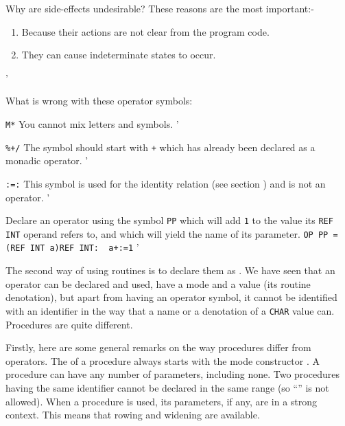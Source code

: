 \begin{exercise}
\item Why are side-effects undesirable? \ans These reasons are the
most important:-
\begin{enumerate}
\item Because their actions are not clear from the program code.
\item They can cause indeterminate states to occur.
\end{enumerate}
'
\item What is wrong with these operator symbols:
\begin{subex}
\item \verb|M*| \subans You cannot mix letters and symbols.
'
\item \verb|%+/| \subans The symbol should start with \verb|+| which
has already been declared as a monadic operator.
'
\item \verb|:=:| \subans This symbol is used for the identity
relation (see section ) and is not an operator.
'
\end{subex}
\item Declare an operator using the symbol \verb|PP| which will add
\verb|1| to the value its \verb|REF INT| operand refers to, and which
will yield the name of its parameter.
\ans \verb|OP PP = (REF INT a)REF INT:  a+:=1|
'
\end{exercise}

The second way of using routines is to declare them as
. We have seen that an operator can be
declared and used, have a mode and a value (its routine denotation),
but apart from having an operator symbol, it cannot be identified with
an identifier in the way that a name or a denotation of a \verb|CHAR|
value can.  Procedures are quite different.

Firstly, here are some general remarks on the way procedures differ
from operators.  The  of a procedure
always starts with the mode constructor .  A procedure can
have any number of parameters, including none.  Two procedures having
the same identifier cannot be declared in the same range (so
``'' is not allowed).  When a procedure is used, its
parameters, if any, are in a strong context. This means that rowing
and widening are available.

